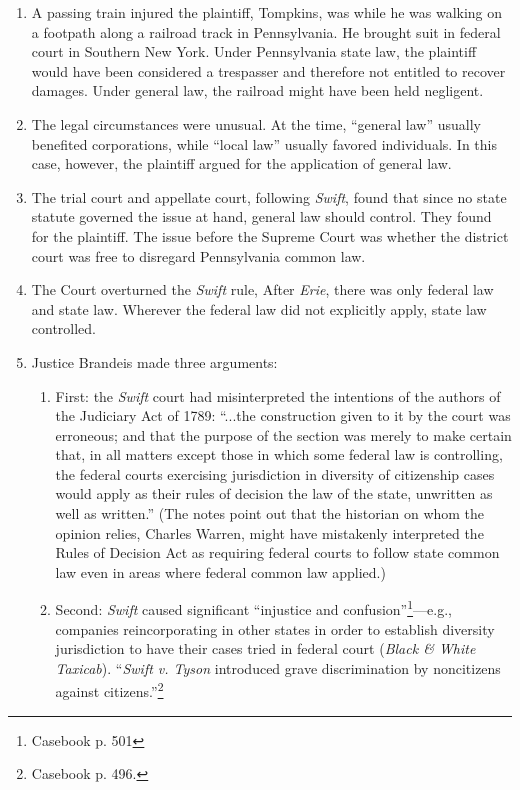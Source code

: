 \begin{enumerate}
    \item A passing train injured the plaintiff, Tompkins, was while he was walking on a footpath along a railroad track in Pennsylvania. He brought suit in federal court in Southern New York. Under Pennsylvania state law, the plaintiff would have been considered a trespasser and therefore not entitled to recover damages. Under general law, the railroad might have been held negligent.
    \item The legal circumstances were unusual. At the time, ``general law'' usually benefited corporations, while ``local law'' usually favored individuals. In this case, however, the plaintiff argued for the application of general law.
    \item The trial court and appellate court, following \emph{Swift}, found that since no state statute governed the issue at hand, general law should control. They found for the plaintiff. The issue before the Supreme Court was whether the district court was free to disregard Pennsylvania common law.
    \item The Court overturned the \emph{Swift} rule, After \emph{Erie}, there was only federal law and state law. Wherever the federal law did not explicitly apply, state law controlled.
    \item Justice Brandeis made three arguments:
    \begin{enumerate}
        \item First: the \emph{Swift} court had misinterpreted the intentions of the authors of the Judiciary Act of 1789: ``...the construction given to it by the court was erroneous; and that the purpose of the section was merely to make certain that, in all matters except those in which some federal law is controlling, the federal courts exercising jurisdiction in diversity of citizenship cases would apply as their rules of decision the law of the state, unwritten as well as written.'' (The notes point out that the historian on whom the opinion relies, Charles Warren, might have mistakenly interpreted the Rules of Decision Act as requiring federal courts to follow state common law even in areas where federal common law applied.)
        \item Second: \emph{Swift} caused significant ``injustice and confusion''\footnote{Casebook p. 501}---e.g., companies reincorporating in other states in order to establish diversity jurisdiction to have their cases tried in federal court (\emph{Black \& White Taxicab}). ``\emph{Swift v. Tyson} introduced grave discrimination by noncitizens against citizens.''\footnote{Casebook p. 496.}

\end{enumerate}
\end{enumerate}
